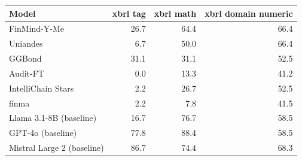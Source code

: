 \begin{tabular}{lrrr}
\toprule
Model & xbrl tag & xbrl math & xbrl domain numeric \\
\midrule
FinMind-Y-Me & 26.7 & 64.4 & 66.4 \\
Uniandes & 6.7 & 50.0 & 66.4 \\
GGBond & 31.1 & 31.1 & 52.5 \\
Audit-FT & 0.0 & 13.3 & 41.2 \\
IntelliChain Stars & 2.2 & 26.7 & 52.5 \\
finma & 2.2 & 7.8 & 41.5 \\
Llama 3.1-8B (baseline) & 16.7 & 76.7 & 58.5 \\
GPT-4o (baseline) & 77.8 & 88.4 & 58.5 \\
Mistral Large 2 (baseline) & 86.7 & 74.4 & 68.3 \\
\bottomrule
\end{tabular}
